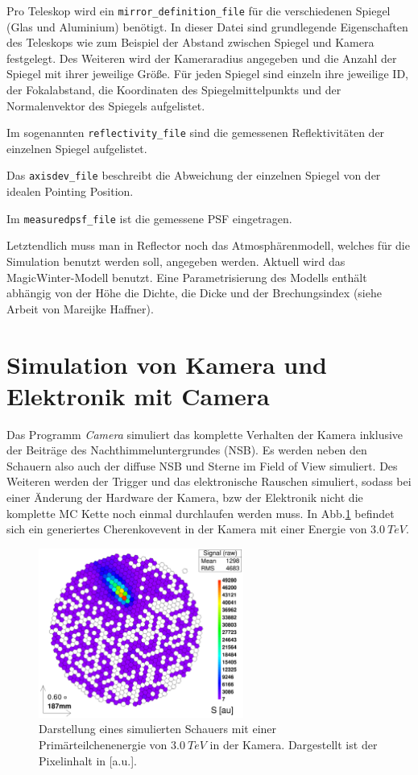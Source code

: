 Pro Teleskop wird ein \texttt{mirror\_definition\_file} für die verschiedenen Spiegel (Glas und Aluminium) benötigt.
In dieser Datei sind grundlegende Eigenschaften des Teleskops wie zum Beispiel der Abstand zwischen Spiegel und Kamera festgelegt. 
Des Weiteren wird der Kameraradius angegeben und die Anzahl der Spiegel mit ihrer jeweilige Größe.
Für jeden Spiegel sind einzeln ihre jeweilige ID, der Fokalabstand, die Koordinaten des Spiegelmittelpunkts und der Normalenvektor des Spiegels aufgelistet.

Im sogenannten \texttt{reflectivity\_file} sind die gemessenen Reflektivitäten der einzelnen Spiegel aufgelistet.

Das \texttt{axisdev\_file} beschreibt die Abweichung der einzelnen Spiegel von der idealen Pointing Position.

Im \texttt{measuredpsf\_file} ist die gemessene PSF eingetragen.

Letztendlich muss man in Reflector noch das Atmosphärenmodell, welches für die Simulation benutzt werden soll, angegeben werden. 
Aktuell wird das MagicWinter-Modell benutzt. 
Eine Parametrisierung des Modells enthält abhängig von der Höhe die Dichte, die Dicke und der Brechungsindex (siehe Arbeit von Mareijke Haffner).


\section{Simulation von Kamera und Elektronik mit Camera}
Das Programm \textit{Camera} simuliert das komplette Verhalten der Kamera inklusive der Beiträge des Nachthimmeluntergrundes (NSB).
Es werden neben den Schauern also auch der diffuse NSB und Sterne im Field of View simuliert. 
Des Weiteren werden der Trigger und das elektronische Rauschen simuliert, sodass bei einer Änderung der Hardware der Kamera, bzw der Elektronik nicht die komplette MC Kette noch einmal durchlaufen werden muss.
In Abb.\ref{Kamera-Bild} befindet sich ein generiertes Cherenkovevent in der Kamera mit einer Energie von $\SI{3.0}{TeV}$.

\begin{figure}
    \centering
    \includegraphics[width=0.6\textwidth]{./Plots/Signal_Job481_RunNr1513276_511_e3.0TeV_Zd32.2_fertig.png}
    \caption{Darstellung eines simulierten Schauers mit einer Primärteilchenenergie von $\SI{3.0}{TeV}$ in der Kamera. Dargestellt ist der Pixelinhalt in [a.u.].}
    \label{Kamera-Bild}
\end{figure}

